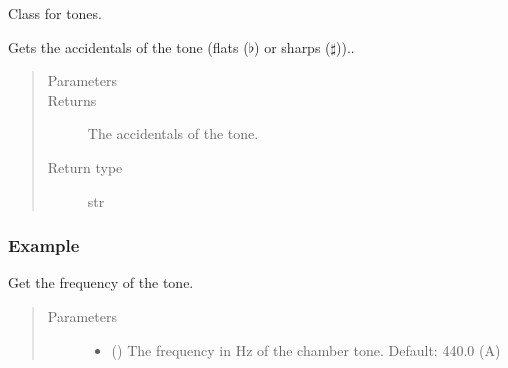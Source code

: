 \documentclass[letterpaper,10pt,english]{sphinxmanual}
\begin{document}
\begin{fulllineitems}
Class for tones.


\begin{fulllineitems}
Gets the accidentals of the tone (flats (\(\flat\)) or sharps (\(\sharp\)))..
\begin{quote}\begin{description}
\item[{Parameters}] \leavevmode
{} \textendash{} 

\item[{Returns}] \leavevmode
The accidentals of the tone.

\item[{Return type}] \leavevmode
str

\end{description}\end{quote}
\subsubsection*{Example}

\begin{sphinxVerbatim}[commandchars=\\\{\}]
   
\end{sphinxVerbatim}

\end{fulllineitems}



\begin{fulllineitems}
Get the frequency of the tone.
\begin{quote}\begin{description}
\item[{Parameters}] \leavevmode\begin{itemize}
\item {} 
 () \textendash{} The frequency in Hz of the chamber tone. Default: 440.0 (A)


\end{itemize}
\end{description}
\end{quote}
\end{fulllineitems}
\end{fulllineitems}
\end{document}

